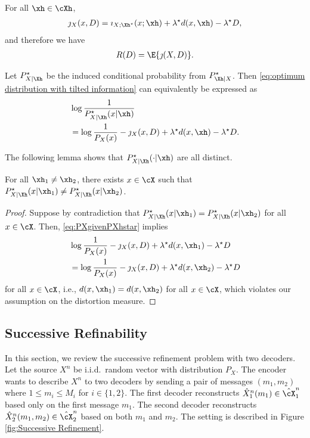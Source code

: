 \documentclass[draftclsnofoot, onecolumn, letterpaper, romanappendices]{IEEEtran}
\begin{document}
\begin{theorem}\cite[Lemma 1.4]{csiszar1974extremum}
    For all $\xh\in\cXh$, 
    \begin{align}
        \jmath_X(x,D)= \imath_{X;\Xh^{\star}}(x;\xh) + \lambda^{\star} d(x,\xh)
            -\lambda^{\star} D,\label{eq:optimum distribution with tilted information}
    \end{align}
    and therefore we have
    \begin{align*}
        R(D) = \E{\jmath(X,D)}.
    \end{align*}
\end{theorem}
Let $P_{X|\Xh}^\star$ be the induced conditional probability from $P_{\Xh|X}^\star$.
Then \eqref{eq:optimum distribution with tilted information} can equivalently be expressed as
\begin{align}
    &\log \frac{1}{P_{X|\Xh}^\star(x|\xh)}\nonumber\\
    &= \log \frac{1}{P_X(x)} -\jmath_X(x,D) +\lambda^\star d(x,\xh) - \lambda^\star D.
        \label{eq:PXgivenPXhstar}
\end{align}

The following lemma shows that $P^{\star}_{X|\Xh}(\cdot|\xh)$ are all distinct.
\begin{lemma}\label{lem:uniqueness of rows}
    For all $\xh_1\neq \xh_2$, there exists $x\in\cX$ such that
    $P^{\star}_{X|\Xh}(x|\xh_1)\neq P^{\star}_{X|\Xh}(x|\xh_2)$.
\end{lemma} 

\begin{proof}
    Suppose by contradiction that $P_{X|\Xh}^{\star}(x|\xh_1) = P_{X|\Xh}^{\star}(x|\xh_2)$ for all $x\in \cX$.
    Then, \eqref{eq:PXgivenPXhstar} implies
    \begin{align*}
    &\log \frac{1}{P_X(x)} -\jmath_X(x,D) +\lambda^\star d(x,\xh_1) - \lambda^\star D\\
    &=\log \frac{1}{P_X(x)} -\jmath_X(x,D) +\lambda^\star d(x,\xh_2) - \lambda^\star D
    \end{align*}
    for all $x\in\cX$, i.e., $d(x,\xh_1) = d(x,\xh_2)$ for all $x\in\cX$,
    which violates our assumption on the distortion measure.
\end{proof}




\subsection{Successive Refinability}\label{subsec:Successive Refinability}
In this section, we review the successive refinement problem with two decoders.
Let the source $X^n$ be i.i.d.\ random vector with distribution $P_X$.
The encoder wants to describe $X^n$ to two decoders by sending a pair of messages $(m_1,m_2)$
where $1\leq m_i\leq M_i$ for $i \in \{1,2\}$.
The first decoder reconstructs $\hat{X}_1^n(m_1)\in\hat{\cX}_1^n$ based only on the first message $m_1$.
The second decoder reconstructs $\hat{X}_2^n(m_1,m_2)\in\hat{\cX}_2^n$ based on both $m_1$ and $m_2$.
The setting is described in Figure \ref{fig:Successive Refinement}.
\end{document}
